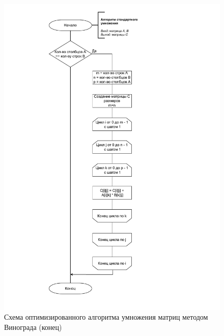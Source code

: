 \begin{figure}[h]
	\centering
	\includegraphics[height=0.9\textheight, page=5]{img/algorithms.pdf}
	\caption{Схема оптимизированного алгоритма умножения матриц методом Винограда (конец)}
	\label{fig:VinogradOpt2}
\end{figure}

\clearpage


